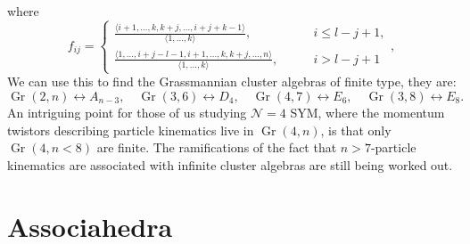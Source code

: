 \documentclass[11pt]{article}
\DeclareMathOperator{\Gr}{Gr}
\begin{document}
\noindent where
\begin{equation}
  f_{i j} =
  \begin{cases}
    \frac {\langle i+1, \dotsc, k, k+j, \dotsc, i+j+k-1\rangle}{\langle 1, \dotsc, k\rangle}, \qquad &i \leq l-j+1,\\
    \frac {\langle 1, \dotsc, i+j-l-1, i+1, \dotsc, k, k+j, \dotsc, n\rangle}{\langle 1, \dotsc, k\rangle}, \qquad &i > l-j+1
  \end{cases},
\end{equation}
We can use this to find the Grassmannian cluster algebras of finite type, they are:
\begin{equation}
	\Gr(2,n) \leftrightarrow A_{n-3}, \quad \Gr(3,6) \leftrightarrow D_4, \quad \Gr(4,7) \leftrightarrow E_6, \quad \Gr(3,8) \leftrightarrow E_8.
\end{equation}
An intriguing point for those of us studying $\mathcal{N}=4$ SYM, where the momentum twistors describing particle kinematics live in $\Gr(4,n)$, is that only $\Gr(4,n<8)$ are finite. The ramifications of the fact that $n>7$-particle kinematics are associated with infinite cluster algebras are still being worked out. 

\section{Associahedra}
\end{document}
